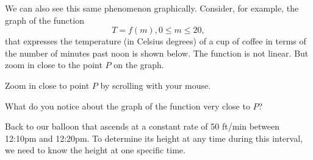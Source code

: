 \documentclass{ximera}
\begin{document}
We can also see this same phenomenon graphically. Consider, for example, the graph of the function
\[
    T = f(m) , 0\leq m \leq 20 ,
\]
that expresses the temperature (in Celsius degrees) of a cup of coffee in terms of the number of minutes past noon is shown below. The function is not linear. But zoom in close to the point $P$ on the graph.

\begin{exploration}\label{Exp1:LF}
Zoom in close to point $P$ by scrolling with your mouse. 
\begin{question} \label{Q2:LF}
What do you notice about the graph of the function very close to $P$?
\end{question}

 
\begin{onlineOnly}
    \begin{center}
\end{center}
\end{onlineOnly}
\end{exploration}


Back to our balloon that ascends at a constant rate of 50 ft/min between 12:10pm and 12:20pm. To determine its height at any time during this interval, we need to know the height at one specific time. 
\end{document}
